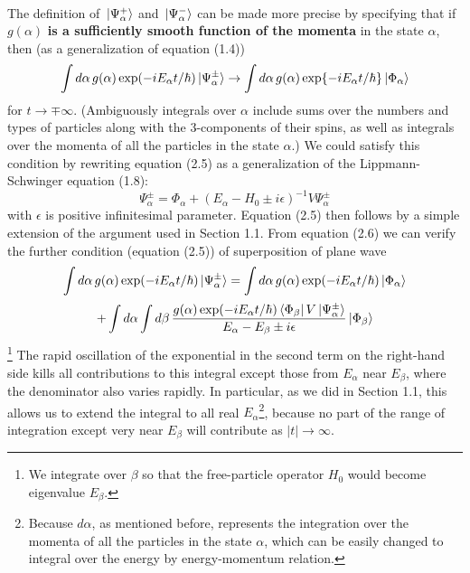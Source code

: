 \documentclass[12pt]{article}
\numberwithin{equation}{section}
\begin{document}
\\\indent The definition of $\ket*{\Psi_{\alpha}^{+}}$ and $\ket*{\Psi_{\alpha}^{-}}$ can be made more precise by specifying that if $g(\alpha)$ \textbf{is a sufficiently smooth function of the momenta} in the state $\alpha$, then (as a generalization of equation (1.4))
\begin{equation}
    \int{d\alpha\,g(\alpha)\exp(-iE_{\alpha}t/\hbar)\ket*{\Psi_{\alpha}^{\pm}}}\rightarrow\int{d\alpha\,g(\alpha)\exp{-iE_{\alpha}t/\hbar}\ket*{\Phi_{\alpha}}}
\end{equation}
for $t\rightarrow\mp\infty$. (Ambiguously integrals over $\alpha$ include sums over the numbers and types of particles along with the 3-components of their spins, as well as integrals over the momenta of all the particles in the state $\alpha$.)
We could satisfy this condition by rewriting equation (2.5) as a generalization of the Lippmann-Schwinger equation (1.8):
\begin{equation}
    \Psi^{\pm}_{\alpha} = \Phi_{\alpha}+\left(E_{\alpha}-H_0\pm i\epsilon\right)^{-1}V\Psi_{\alpha}^{\pm}
\end{equation}
with $\epsilon$ is positive infinitesimal parameter. Equation (2.5) then follows by a simple extension of the argument used in Section 1.1. 
From equation (2.6) we can verify the further condition (equation (2.5)) of superposition of plane wave
\[
    \int{d\alpha\,g(\alpha)\exp(-iE_{\alpha}t/\hbar)\ket*{\Psi_{\alpha}^{\pm}}} = \int{d\alpha\,g(\alpha)\exp(-iE_{\alpha}t/\hbar)\ket*{\Phi_{\alpha}}}
\]
\begin{equation}
    +\int{d\alpha}\int{d\beta\,\frac{g(\alpha)\exp(-iE_{\alpha}t/\hbar)\bra*{\Phi_{\beta}}V\ket*{\Psi_{\alpha}^{\pm}}}{E_{\alpha}-E_{\beta}\pm i\epsilon}\ket*{\Phi_{\beta}}}
\end{equation}\footnote{We integrate over $\beta$ so that the free-particle operator $H_0$ would become eigenvalue $E_{\beta}$.}
The rapid oscillation of the exponential in the second term on the right-hand side kills all contributions to this integral except those from $E_{\alpha}$ near $E_{\beta}$, where the denominator also varies rapidly. 
In particular, as we did in Section 1.1, this allows us to extend the integral to all real $E_{\alpha}$\footnote{Because $d\alpha$, as mentioned before, represents the integration over the momenta of all the particles in the state $\alpha$, which can be easily changed to integral over the energy by energy-momentum relation.}, because no part of the range of integration except very near $E_{\beta}$ will contribute as $|t|\rightarrow\infty$.
\end{document}
